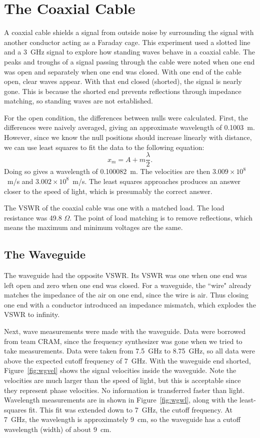 \documentclass[12pt]{article}
\begin{document}
\section{The Coaxial Cable}
A coaxial cable shields a signal from outside noise by surrounding the signal with another conductor acting as a Faraday cage.
This experiment used a slotted line and a 3~GHz signal to explore how standing waves behave in a coaxial cable.
The peaks and troughs of a signal passing through the cable were noted when one end was open and separately when one end was closed.
With one end of the cable open, clear waves appear.
With that end closed (shorted), the signal is nearly gone.
This is because the shorted end prevents reflections through impedance matching, so standing waves are not established. 

For the open condition, the differences between nulls were calculated.
First, the differences were naively averaged, giving an approximate wavelength of 0.1003~m.
However, since we know the null positions should increase linearly with distance, we can use least squares to fit the data to the following equation:
\begin{equation}
x_m=A+m\frac{\lambda}{2}.
\end{equation}
Doing so gives a wavelength of 0.100082~m.
The velocities are then $3.009\times 10^8$~m/s and $3.002\times 10^8$~m/s.
The least squares approaches produces an answer closer to the speed of light, which is presumably the correct answer.

The VSWR of the coaxial cable was one with a matched load. 
The load resistance was 49.8 $\Omega$.
The point of load matching is to remove reflections, which means the maximum and minimum voltages are the same.


\subsection{The Waveguide}
The waveguide had the opposite VSWR.
Its VSWR was one when one end was left open and zero when one end was closed.
For a waveguide, the ``wire" already matches the impedance of the air on one end, since the wire is air.
Thus closing one end with a conductor introduced an impedance mismatch, which explodes the VSWR to infinity.

Next, wave measurements were made with the waveguide.
Data were borrowed from team CRAM, since the frequency synthesizer was gone when we tried to take measurements.
Data were taken from 7.5~GHz to 8.75~GHz, so all data were above the expected cutoff frequency of 7~GHz.
With the waveguide end shorted, Figure~\ref{fig:wgvel} shows the signal velocities inside the waveguide.
Note the velocities are much larger than the speed of light, but this is acceptable since they represent phase velocities.
No information is transferred faster than light.
Wavelength measurements are in shown in Figure~\ref{fig:wgwl}, along with the least-squares fit.
This fit was extended down to 7~GHz, the cutoff frequency.
At 7~GHz, the wavelength is approximately 9~cm, so the waveguide has a cutoff wavelength (width) of about 9~cm.
\end{document}

